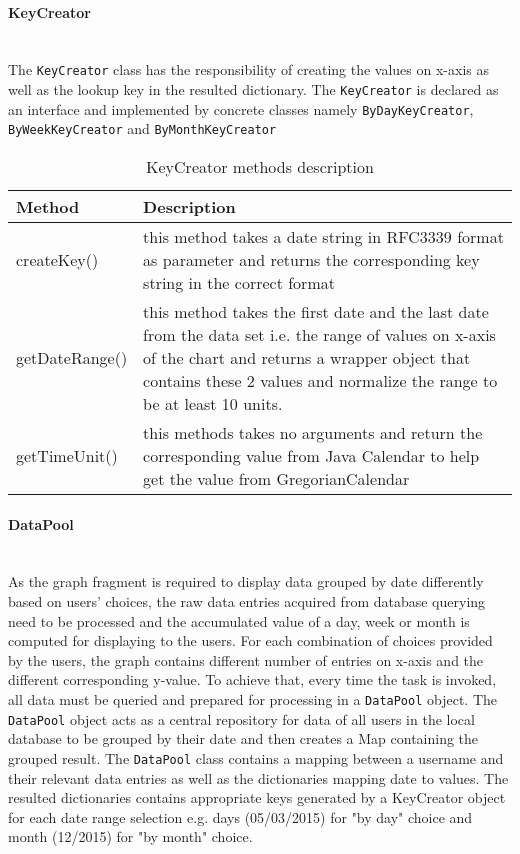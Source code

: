 \paragraph{KeyCreator}\mbox{} \\
The \texttt{KeyCreator} class has the responsibility of creating the values on x-axis as well as the lookup key in the
resulted dictionary. The \texttt{KeyCreator} is declared as an interface and implemented by concrete classes namely
\texttt{ByDayKeyCreator}, \texttt{ByWeekKeyCreator} and \texttt{ByMonthKeyCreator}

\begin{table}
\begin{center}
    \begin{tabularx}{\textwidth}{| l | X |}
        \hline Method & Description \\
        \hline createKey() & 
            this method takes a date string in RFC3339 format as parameter and returns the corresponding key string in
            the correct format \\
        \hline getDateRange() &
            this method takes the first date and the last date from the data set i.e. the range of values on x-axis of
            the chart and returns a wrapper object that contains these 2 values and normalize the range to be at least
            10 units. \\
        \hline getTimeUnit() &
            this methods takes no arguments and return the corresponding value from Java Calendar to help get the value
            from GregorianCalendar \\
        \hline
    \end{tabularx}
\end{center}
    \caption{KeyCreator methods description}
\end{table}

\paragraph{DataPool}\mbox{} \\
As the graph fragment is required to display data grouped by date differently based on users' choices, the raw data
entries acquired from database querying need to be processed and the accumulated value of a day, week or month is
computed for displaying to the users. For each combination of choices provided by the users, the graph contains
different number of entries on x-axis and the different corresponding y-value. To achieve that, every time the task is
invoked, all data must be queried and prepared for processing in a \texttt{DataPool} object. The \texttt{DataPool}
object acts as a central repository for data of all users in the local database to be grouped by their date and then
creates a Map containing the grouped result. The \texttt{DataPool} class contains a mapping between a username and their
relevant data entries as well as the dictionaries mapping date to values. The resulted dictionaries contains appropriate
keys generated by a KeyCreator object for each date range selection e.g. days (05/03/2015) for "by day" choice and month
(12/2015) for "by month" choice.

